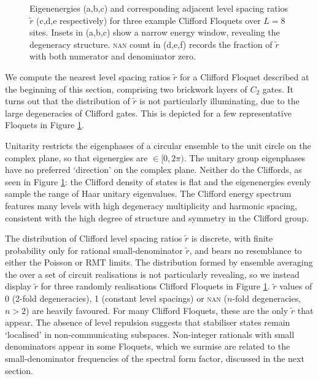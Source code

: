 \documentclass[10pt]{article}
\begin{document}
\begin{figure}[t]
\centering
{}
\caption{Eigenenergies (a,b,c) and corresponding adjacent level spacing ratios $\tilde{r}$ (c,d,e respectively) for three example Clifford Floquets over $L=8$ sites. Insets in (a,b,c) show a narrow energy window, revealing the degeneracy structure. \textsc{nan} count in (d,e,f) records the fraction of $\tilde{r}$ with both numerator and denominator zero.}
\label{fig_rs}
\end{figure}

We compute the nearest level spacing ratios $\tilde{r}$ for a Clifford Floquet described at the beginning of this section, comprising two brickwork layers of $C_2$ gates.  It turns out that the distribution of $\tilde{r}$ is not particularly illuminating, due to the large degeneracies of Clifford gates. This is depicted for a few representative Floquets in Figure \ref{fig_rs}.

Unitarity restricts the eigenphases of a circular ensemble to the unit circle on the complex plane, so that eigenergies are $\in [0, 2\pi)$. The unitary group eigenphases have no preferred `direction' on the complex plane. Neither do the Cliffords, as seen in Figure \ref{fig_rs}: the Clifford density of states is flat and the eigenenergies evenly sample the range of Haar unitary eigenvalues. The Clifford energy spectrum features many levels with high degeneracy multiplicity and harmonic spacing, consistent with the high degree of structure and symmetry in the Clifford group. 

The distribution of Clifford level spacing ratios $\tilde{r}$ is discrete, with finite probability only for rational small-denominator $\tilde{r}$, and bears no resemblance to either the Poisson or RMT limits. The distribution formed by ensemble averaging the over a set of circuit realisations is not particularly revealing, so we instead display $\tilde{r}$ for three randomly realisations Clifford Floquets in Figure \ref{fig_rs}. $\tilde{r}$ values of 0 (2-fold degeneracies), 1 (constant level spacings) or \textsc{nan} ($n$-fold degeneracies, $n>2$) are heavily favoured. For many Clifford Floquets, these are the only $\tilde{r}$ that appear. The absence of level repulsion suggests that stabiliser states remain `localised' in non-communicating subspaces. Non-integer rationals with small denominators appear in some Floquets, which we surmise are related to the small-denominator frequencies of the spectral form factor, discussed in the next section.
\end{document}
